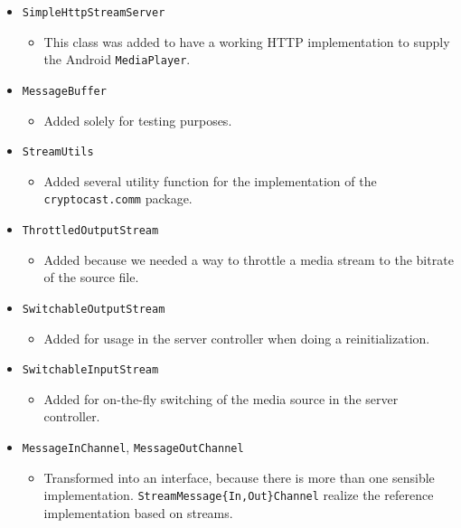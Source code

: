 \documentclass[a4paper,10pt]{scrartcl}
\begin{document}
\begin{itemize}

  \item \lstinline|SimpleHttpStreamServer|
  \begin{itemize}
   \item This class was added to have a working HTTP implementation to supply the Android
	  \lstinline|MediaPlayer|.
  \end{itemize}

   \item \lstinline|MessageBuffer|
  \begin{itemize}
   \item Added solely for testing purposes.
  \end{itemize}

   \item \lstinline|StreamUtils|
  \begin{itemize}
   \item Added several utility function for the implementation of the \lstinline|cryptocast.comm| package.
  \end{itemize}

   \item \lstinline|ThrottledOutputStream|
  \begin{itemize}
   \item Added because we needed a way to throttle a media stream to the bitrate of the source file.
  \end{itemize}

  \item \lstinline|SwitchableOutputStream|
  \begin{itemize}
   \item Added for usage in the server controller when doing a reinitialization.
  \end{itemize}

  \item \lstinline|SwitchableInputStream|
  \begin{itemize}
   \item Added for on-the-fly switching of the media source in the server controller.
  \end{itemize}

  \item \lstinline|MessageInChannel|, \lstinline|MessageOutChannel|
  \begin{itemize}
	 \item Transformed into an interface, because there is more than one sensible implementation.
	 \lstinline|StreamMessage{In,Out}Channel| realize the reference implementation based on streams.
  \end{itemize}


\end{itemize}
\end{document}
